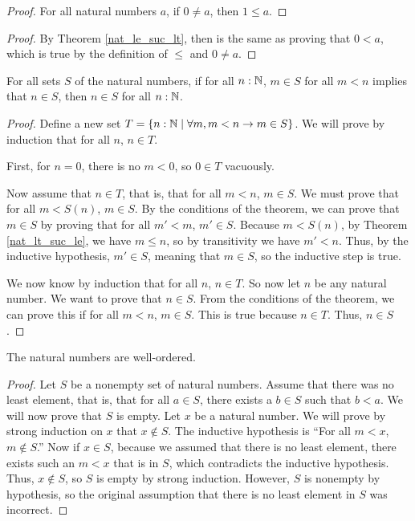 \documentclass[../../math.tex]{subfiles}
\begin{document}
\begin{proof} \label{nat_neq0_leq1}
    For all natural numbers $a$, if $0 \neq a$, then $1 \leq a$.
\end{proof}
\begin{proof}
    By Theorem \ref{nat_le_suc_lt}, then is the same as proving that $0 < a$,
    which is true by the definition of $\leq$ and $0 \neq a$.
\end{proof}

\begin{theorem}
    For all sets $S$ of the natural numbers, if for all $n : \mathbb{N}$, $m \in S$ for
    all $m < n$ implies that $n \in S$, then $n \in S$ for all $n : \mathbb{N}$.
\end{theorem}
\begin{proof}
    Define a new set $T = \{n : \mathbb{N} \mid \forall m, m < n \rightarrow m \in S\}$.
    We will prove by induction that for all $n$, $n \in T$.

    First, for $n = 0$, there is no $m < 0$, so $0 \in T$ vacuously.

    Now assume that $n \in T$, that is, that for all $m < n$, $m \in S$.  We
    must prove that for all $m < S(n)$, $m \in S$.  By the conditions of the
    theorem, we can prove that $m \in S$ by proving that for all $m' < m$, $m'
    \in S$.  Because $m < S(n)$, by Theorem \ref{nat_lt_suc_le}, we have $m \leq
    n$, so by transitivity we have $m' < n$.  Thus, by the inductive hypothesis,
    $m' \in S$, meaning that $m \in S$, so the inductive step is true.

    We now know by induction that for all $n$, $n \in T$.  So now let $n$ be any
    natural number.  We want to prove that $n \in S$.  From the conditions of
    the theorem, we can prove this if for all $m < n$, $m \in S$.  This is true
    because $n \in T$.  Thus, $n \in S$.
\end{proof}

\begin{instance}
    The natural numbers are well-ordered.
\end{instance}
\begin{proof}
    Let $S$ be a nonempty set of natural numbers.  Assume that there was no
    least element, that is, that for all $a \in S$, there exists a $b \in S$
    such that $b < a$.  We will now prove that $S$ is empty.  Let $x$ be a
    natural number.  We will prove by strong induction on $x$ that $x \notin S$.
    The inductive hypothesis is ``For all $m < x$, $m \notin S$.''  Now if $x
    \in S$, because we assumed that there is no least element, there exists such
    an $m < x$ that is in $S$, which contradicts the inductive hypothesis.
    Thus, $x \notin S$, so $S$ is empty by strong induction.  However, $S$ is
    nonempty by hypothesis, so the original assumption that there is no least
    element in $S$ was incorrect.
\end{proof}
\end{document}
